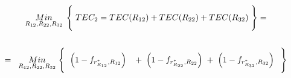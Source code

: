 \documentclass[
  11pt,
  a4paper,
]{article}
\begin{document}
\begin{gather*}
\underset{R_{12}  ,  R_{22},  R_{32}}  {Min} \hspace{0.15cm}  \Biggl\{ \hspace{0.1cm} TEC_2 = TEC(R_{12})  +  TEC(R_{22}) +  TEC(R_{32}) \hspace{0.1cm} \Biggl\}   \hspace{0.1cm} =   \\ \\
=\hspace{0.2cm} \underset{R_{12}  ,  R_{22}, R_{32}}  {Min} \hspace{0.1cm} \Biggl\{  \hspace{0.2cm}  \left( 1 - f_{r^*_{R_{12}} , R_{12}} \right)  \hspace{0.3cm} +  \hspace{0.1cm}       \left( 1 - f_{r^*_{R_{22}} , R_{22}} \right) \hspace{0.1cm} +  \hspace{0.1cm} \left( 1 - f_{r^*_{R_{32}} , R_{32}} \right)  \hspace{0.2cm}  \Biggl\}  \\ \\

\end{gather*}
\end{document}
